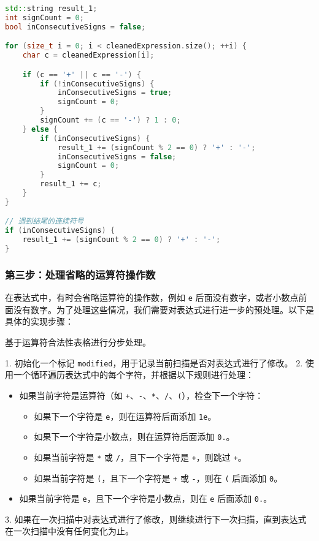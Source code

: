 \documentclass[UTF8]{ctexart}
\begin{document}
\begin{lstlisting}[language=C++, breaklines=true]
std::string result_1;
int signCount = 0;
bool inConsecutiveSigns = false;

for (size_t i = 0; i < cleanedExpression.size(); ++i) {
    char c = cleanedExpression[i];

    if (c == '+' || c == '-') {
        if (!inConsecutiveSigns) {
            inConsecutiveSigns = true;
            signCount = 0;
        }
        signCount += (c == '-') ? 1 : 0;
    } else {
        if (inConsecutiveSigns) {
            result_1 += (signCount % 2 == 0) ? '+' : '-';
            inConsecutiveSigns = false;
            signCount = 0;
        }
        result_1 += c;
    }
}

// 遇到结尾的连续符号
if (inConsecutiveSigns) {
    result_1 += (signCount % 2 == 0) ? '+' : '-';
}
\end{lstlisting}

\subsubsection{第三步：处理省略的运算符操作数}

在表达式中，有时会省略运算符的操作数，例如 \texttt{e} 后面没有数字，或者小数点前面没有数字。为了处理这些情况，我们需要对表达式进行进一步的预处理。以下是具体的实现步骤：

基于运算符合法性表格进行分步处理。

1. 初始化一个标记 \texttt{modified}，用于记录当前扫描是否对表达式进行了修改。
2. 使用一个循环遍历表达式中的每个字符，并根据以下规则进行处理：
   \begin{itemize}
     \item 如果当前字符是运算符（如 \texttt{+}、\texttt{-}、\texttt{*}、\texttt{/}、\texttt{(}），检查下一个字符：
       \begin{itemize}
         \item 如果下一个字符是 \texttt{e}，则在运算符后面添加 \texttt{1e}。
         \item 如果下一个字符是小数点，则在运算符后面添加 \texttt{0.}。
         \item 如果当前字符是 \texttt{*} 或 \texttt{/}，且下一个字符是 \texttt{+}，则跳过 \texttt{+}。
         \item 如果当前字符是 \texttt{(}，且下一个字符是 \texttt{+} 或 \texttt{-}，则在 \texttt{(} 后面添加 \texttt{0}。
       \end{itemize}
     \item 如果当前字符是 \texttt{e}，且下一个字符是小数点，则在 \texttt{e} 后面添加 \texttt{0.}。
   \end{itemize}
3. 如果在一次扫描中对表达式进行了修改，则继续进行下一次扫描，直到表达式在一次扫描中没有任何变化为止。
\end{document}
